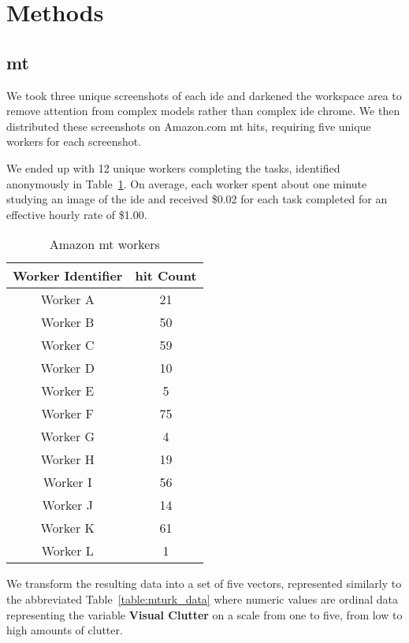 \section{Methods}
\label{sec:methods}

\subsection{\acl{mt}}
We took three unique screenshots of each \ac{ide} and darkened the
workspace area to remove attention from complex models rather than complex
\ac{ide} chrome. We then distributed these screenshots on Amazon.com
\ac{mt} \acp{hit}, requiring five unique workers for each
screenshot.

We ended up with 12 unique workers completing the tasks, identified
anonymously in Table~\ref{table:mturk_workers}.
On average, each worker spent about one minute studying an
image of the \ac{ide} and received \$0.02 for each task completed for an
effective hourly rate of \$1.00.

\noindent
\begin{table}[!htb]\centering
{}
\begin{tabular}{@{}cc@{}}\toprule
  \textbf{Worker Identifier} & \textbf{\ac{hit} Count} \\
  \midrule
  Worker A & 21 \\
  Worker B & 50 \\
  Worker C & 59 \\
  Worker D & 10 \\
  Worker E & 5 \\
  Worker F & 75 \\
  Worker G & 4 \\
  Worker H & 19 \\
  Worker I & 56 \\
  Worker J & 14 \\
  Worker K & 61 \\
  Worker L & 1 \\
  \bottomrule
\end{tabular}
\caption{Amazon \acs{mt} workers}
\label{table:mturk_workers}
\end{table}

We transform the resulting data into a set of five vectors, represented
similarly to the abbreviated Table~\ref{table:mturk_data} where numeric
values are ordinal data representing the variable \textbf{Visual Clutter}
on a scale from one to five, from low to high amounts of clutter.

